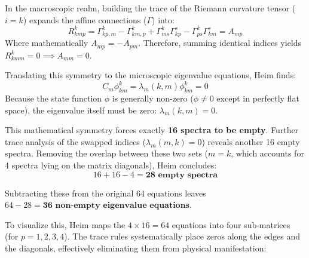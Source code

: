 \documentclass[11pt,a4paper,oneside]{article}
\begin{document}
In the macroscopic realm, building the trace of the Riemann curvature tensor ($i=k$) expands the affine connections ($\Gamma$) into:
\begin{equation}
    R_{kmp}^k = \Gamma_{kp,m}^k - \Gamma_{km,p}^k + \Gamma_{ms}^k \Gamma_{kp}^s - \Gamma_{ps}^k \Gamma_{km}^s = A_{mp}
\end{equation}
Where mathematically $A_{mp} = -A_{pm}$. Therefore, summing identical indices yields $R_{kmm}^k = 0 \implies A_{mm} = 0$.

Translating this symmetry to the microscopic eigenvalue equations, Heim finds:
\begin{equation}
    C_m \phi_{km}^k = \lambda_m(k, m) \phi_{km}^k = 0
\end{equation}
Because the state function $\phi$ is generally non-zero ($\phi \neq 0$ except in perfectly flat space), the eigenvalue itself must be zero: $\lambda_m(k, m) = 0$. 

This mathematical symmetry forces exactly \textbf{16 spectra to be empty}. Further trace analysis of the swapped indices ($\lambda_m(m, k) = 0$) reveals another 16 empty spectra. Removing the overlap between these two sets ($m=k$, which accounts for 4 spectra lying on the matrix diagonals), Heim concludes:
\begin{equation}
    16 + 16 - 4 = \textbf{28 empty spectra}
\end{equation}

Subtracting these from the original 64 equations leaves $64 - 28 = \textbf{36 non-empty eigenvalue equations}$. 

To visualize this, Heim maps the $4 \times 16 = 64$ equations into four sub-matrices (for $p=1, 2, 3, 4$). The trace rules systematically place zeros along the edges and the diagonals, effectively eliminating them from physical manifestation:
\end{document}
